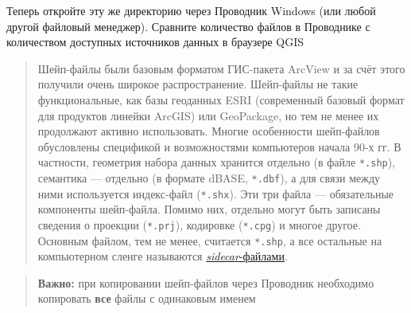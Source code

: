 \documentclass[
  12pt,
]{book}
\begin{document}
Теперь откройте эту же директорию через Проводник Windows (или любой другой файловый менеджер). Сравните количество файлов в Проводнике с количеством доступных источников данных в браузере QGIS

\begin{quote}
Шейп-файлы были базовым форматом ГИС-пакета ArcView и за счёт этого получили очень широкое распространение. Шейп-файлы не такие функциональные, как базы геоданных ESRI (современный базовый формат для продуктов линейки ArcGIS) или GeoPackage, но тем не менее их продолжают активно использовать. Многие особенности шейп-файлов обусловлены спецификой и возможностями компьютеров начала 90-х гг. В частности, геометрия набора данных хранится отдельно (в файле \texttt{*.shp}), семантика --- отдельно (в формате dBASE, \texttt{*.dbf}), а для связи между ними используется индекс-файл (\texttt{*.shx}). Эти три файла --- обязательные компоненты шейп-файла. Помимо них, отдельно могут быть записаны сведения о проекции (\texttt{*.prj}), кодировке (\texttt{*.cpg}) и многое другое. Основным файлом, тем не менее, считается \texttt{*.shp}, а все остальные на компьютерном сленге называются \href{https://en.wikipedia.org/wiki/Sidecar_file}{\emph{sidecar}-файлами}.
\end{quote}

\begin{quote}
\textbf{Важно:} при копировании шейп-файлов через Проводник необходимо копировать \textbf{все} файлы с одинаковым именем
\end{quote}
\end{document}
